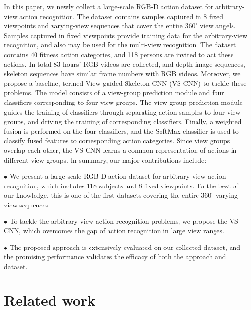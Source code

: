 \documentclass[journal]{IEEEtran}
\begin{document}
In this paper, we newly collect a large-scale RGB-D action dataset for arbitrary-view action recognition. The dataset contains samples captured in 8 fixed viewpoints and varying-view sequences that cover the entire $360^\circ$ view angels. Samples captured in fixed viewpoints provide training data for the arbitrary-view recognition, and also may be used for the multi-view recognition. The dataset contains 40 fitness action categories, and 118 persons are invited to act these actions. In total 83 hours' RGB videos are collected, and depth image sequences, skeleton sequences have similar frame numbers with RGB videos.
Moreover, we propose a baseline, termed View-guided Skeleton-CNN (VS-CNN) to tackle these problems. The model consists of a view-group prediction module and four classifiers corresponding to four view groups. The view-group prediction module guides the training of classifiers through separating action samples to four view groups, and driving the training of corresponding classifiers. Finally, a weighted fusion is performed on the four classifiers, and the SoftMax classifier is used to classify fused features to corresponding action categories. Since view groups overlap each other, the VS-CNN learns a common representation of actions in different view groups. In summary, our major contributions include:

$\bullet$
We present a large-scale RGB-D action dataset for arbitrary-view action recognition, which includes 118 subjects and 8 fixed viewpoints. To the best of our knowledge, this is one of the first datasets covering the entire $360^\circ$ varying-view sequences.

$\bullet$
To tackle the arbitrary-view action recognition problems, we propose the VS-CNN, which overcomes the gap of action recognition in large view ranges.

$\bullet$
The proposed approach is extensively evaluated on our collected dataset, and the promising performance validates the efficacy of both the approach and dataset.


\section{Related work}
\label{sec:relatedWork}
\end{document}
